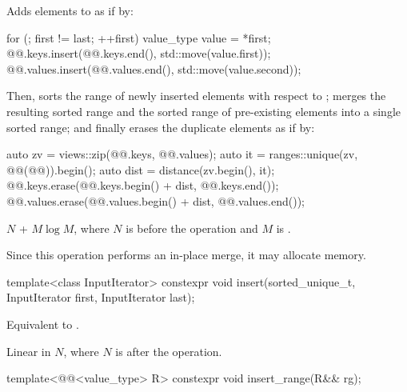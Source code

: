 \begin{itemdescr}
\pnum
\effects
Adds elements to  as if by:
\begin{codeblock}
for (; first != last; ++first) {
  value_type value = *first;
  @@.keys.insert(@@.keys.end(), std::move(value.first));
  @@.values.insert(@@.values.end(), std::move(value.second));
}
\end{codeblock}
Then, sorts the range of newly inserted elements
with respect to ;
merges the resulting sorted range and
the sorted range of pre-existing elements into a single sorted range; and
finally erases the duplicate elements as if by:
\begin{codeblock}
auto zv = views::zip(@@.keys, @@.values);
auto it = ranges::unique(zv, @@(@@)).begin();
auto dist = distance(zv.begin(), it);
@@.keys.erase(@@.keys.begin() + dist, @@.keys.end());
@@.values.erase(@@.values.begin() + dist, @@.values.end());
\end{codeblock}

\pnum
\complexity
$N$ + $M \log M$,
where $N$ is  before the operation and
$M$ is .

\pnum
\remarks
Since this operation performs an in-place merge, it may allocate memory.
\end{itemdescr}

%
\begin{itemdecl}
template<class InputIterator>
  constexpr void insert(sorted_unique_t, InputIterator first, InputIterator last);
\end{itemdecl}

\begin{itemdescr}
\pnum
\effects
Equivalent to .

\pnum
\complexity
Linear in $N$, where $N$ is  after the operation.
\end{itemdescr}

%
\begin{itemdecl}
template<@@<value_type> R>
  constexpr void insert_range(R&& rg);
\end{itemdecl}

